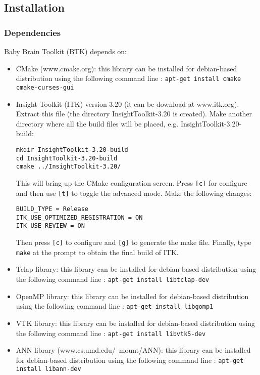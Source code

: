 \documentclass[a4paper,10pt]{article}
\begin{document}
\subsection{Installation}

\subsubsection{Dependencies}

Baby Brain Toolkit (BTK) depends on:
\begin{itemize}
 \item CMake (www.cmake.org): this library can be installed for debian-based
distribution using the following command line : \texttt{apt-get install
cmake cmake-curses-gui}
 \item Insight Toolkit (ITK) version 3.20 (it can be download at www.itk.org). Extract this file (the directory InsightToolkit-3.20 is created). Make another directory where all the build files will be placed, e.g. InsightToolkit-3.20-build:
\begin{verbatim}
mkdir InsightToolkit-3.20-build
cd InsightToolkit-3.20-build
cmake ../InsightToolkit-3.20/
\end{verbatim}
This will bring up the CMake configuration screen. Press \texttt{[c]} for configure and then use \texttt{[t]} to toggle the advanced mode. Make the following changes:
\begin{verbatim}
BUILD_TYPE = Release
ITK_USE_OPTIMIZED_REGISTRATION = ON
ITK_USE_REVIEW = ON
\end{verbatim}
Then press \texttt{[c]} to configure and \texttt{[g]} to generate the make file. Finally, type \texttt{make} at the prompt to obtain the final build of ITK.
 \item Tclap library: this library can be installed for debian-based
distribution using the following command line : \texttt{apt-get install
libtclap-dev}
 \item OpenMP library: this library can be installed for debian-based
distribution using the following command line : \texttt{apt-get install
libgomp1}
 \item VTK library: this library can be installed for debian-based
distribution using the following command line : \texttt{apt-get install
libvtk5-dev}
 \item ANN library (www.cs.umd.edu/~mount/ANN): this library can be installed
for debian-based distribution using the following command line : \texttt{apt-get
install libann-dev}

\end{itemize}
\end{document}
